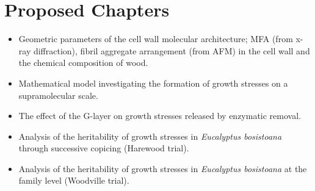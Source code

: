\section{Proposed Chapters}
\begin{itemize}
\item Geometric parameters of the cell wall molecular architecture; MFA (from x-ray
diffraction), fibril aggregate arrangement (from AFM) in the  cell wall and the
chemical composition of wood.
\end{itemize}

\begin{itemize}
\item Mathematical model investigating the formation of growth stresses on a
supramolecular scale.
\end{itemize}

\begin{itemize}
\item The effect of the G-layer on growth stresses released by enzymatic removal.
\end{itemize}
\begin{itemize}
\item Analysis of the heritability of growth stresses in \textit{Eucalyptus bosistoana} through
successive copicing (Harewood trial).
\end{itemize}

\begin{itemize}
\item Analysis of the heritability of growth stresses in \textit{Eucalyptus bosistoana} at the
family level (Woodville trial).
\end{itemize}

  
  